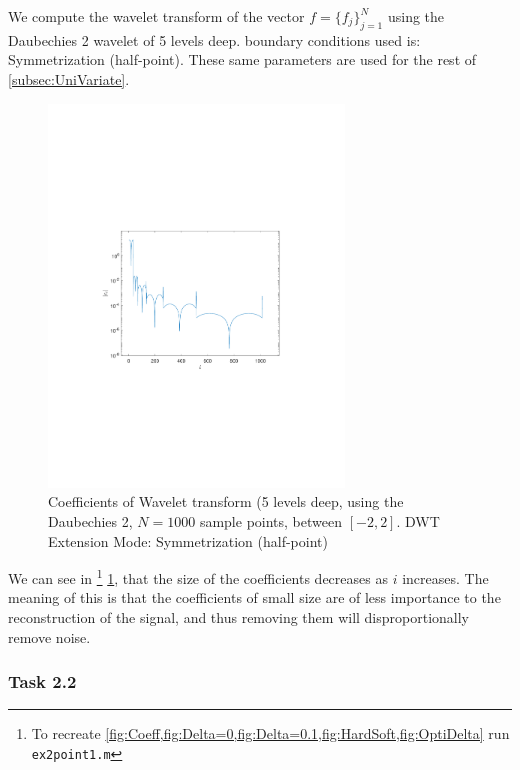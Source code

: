 \documentclass[a4paper]{article}
\begin{document}
    We compute the wavelet transform of the vector $f = \{f_j\}_{j=1}^N$ using the Daubechies 2 wavelet of 5 levels deep. boundary conditions used is: Symmetrization (half-point). These same parameters are used for the rest of \cref{subsec:UniVariate}.
    \begin{figure}[H]
	\centering
	\includegraphics[trim={3.5cm 8cm 4cm 9cm},clip,width=0.7\textwidth]{Images/Coefficents.pdf}
	\caption{Coefficients of Wavelet transform (5 levels deep, using the Daubechies 2, $N=1000$ sample points, between $[-2,2]$. DWT Extension Mode: Symmetrization (half-point)}
	\label{fig:Coeff}
    \end{figure}

    We can see in \footnote{To recreate \cref{fig:Coeff,fig:Delta=0,fig:Delta=0.1,fig:HardSoft,fig:OptiDelta} run \texttt{ex2point1.m}} \cref{fig:Coeff}, that the size of the coefficients decreases as $i$ increases. The meaning of this is that the coefficients of small size are of less importance to the reconstruction of the signal, and thus removing them will disproportionally remove noise.

    \subsubsection{Task 2.2}
\end{document}
